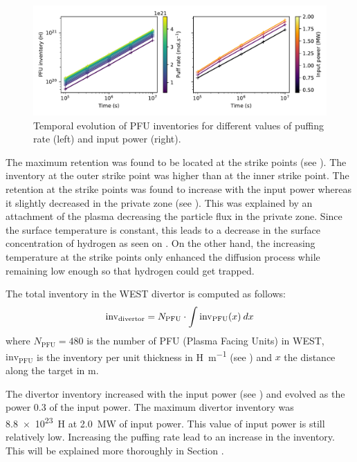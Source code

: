 \begin{figure}[h]
    \centering
    \includegraphics[width=0.8\linewidth]{Figures/Chapter4/WEST/inventory_vs_time_west.pdf}
    \caption{Temporal evolution of PFU inventories for different values of puffing rate (left) and input power (right).}
\end{figure}

The maximum retention was found to be located at the strike points (see ).
The inventory at the outer strike point was higher than at the inner strike point.
The retention at the strike points was found to increase with the input power whereas it slightly decreased in the private zone (see ).
This was explained by an attachment of the plasma decreasing the particle flux in the private zone.
Since the surface temperature is constant, this leads to a decrease in the surface concentration of hydrogen as seen on .
On the other hand, the increasing temperature at the strike points only enhanced the diffusion process while remaining low enough so that hydrogen could get trapped.

The total inventory in the WEST divertor is computed as follows:
\begin{equation}
    \mathrm{inv}_\mathrm{divertor} = N_\mathrm{PFU} \cdot \int \mathrm{inv}_\mathrm{PFU}(x)\: dx
    \labeq{inventory WEST}
\end{equation}
where $N_\mathrm{PFU} = 480$ is the number of PFU (Plasma Facing Units) in WEST, $\mathrm{inv}_\mathrm{PFU}$ is the inventory per unit thickness in \si{H.m^{-1}} (see ) and $x$ the distance along the target in \si{m}.

The divertor inventory increased with the input power (see ) and evolved as the power 0.3 of the input power.
The maximum divertor inventory was \SI{8.8e23}{H} at \SI{2.0}{MW} of input power.
This value of input power is still relatively low.
Increasing the puffing rate lead to an increase in the inventory.
This will be explained more thoroughly in Section .

